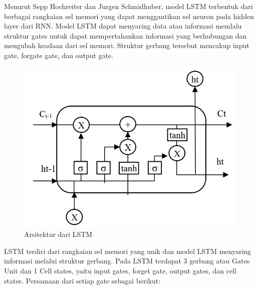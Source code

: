 Menurut Sepp Hochreiter dan Jurgen Schmidhuber, model LSTM terbentuk dari berbagai rangkaian sel memori yang dapat menggantikan sel neuron pada hidden layer dari RNN. Model LSTM dapat menyaring data atau informasi memlalu struktur gates untuk dapat mempertahankan informasi yang berhubungan dan mengubah keadaan dari sel memori. Struktur gerbang tersebut mencakup input gate, forgate gate, dan output gate\cite{Larasati2021}. 
\begin{figure} [H] \centering
  \includegraphics[scale=0.55]{gambar/LSTM.jpg}
  \caption{Arsitektur dari LSTM }
  \label{fig:Arsitektur LSTM }
\end{figure}
LSTM terdiri dari rangkaian sel memori yang unik dan model LSTM menyaring informasi
melalui struktur gerbang. Pada LSTM terdapat 3 gerbang atau Gates Unit dan 1 Cell states, yaitu input gates, forget gate, output gates, dan cell states. Persamaan dari setiap gate sebagai berikut:
